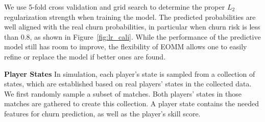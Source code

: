 We use 5-fold cross validation and grid search to determine the proper $L_2$ regularization strength when training the model. The predicted probabilities are well aligned with the real churn probabilities, in particular when churn risk is less than 0.8, as shown in Figure~\ref{fig:lr_cali}. While the performance of the predictive model still has room to improve, the flexibility of EOMM allows one to easily refine or replace the model if better ones are found.




%


\textbf{Player States} In simulation, each player's state is sampled from a collection of states, which are established based on real players' states in the collected data. We first randomly sample a subset of matches. Both players' states in those matches are gathered to create this collection. A player state contains the needed features for churn prediction, as well as the player's skill score.

